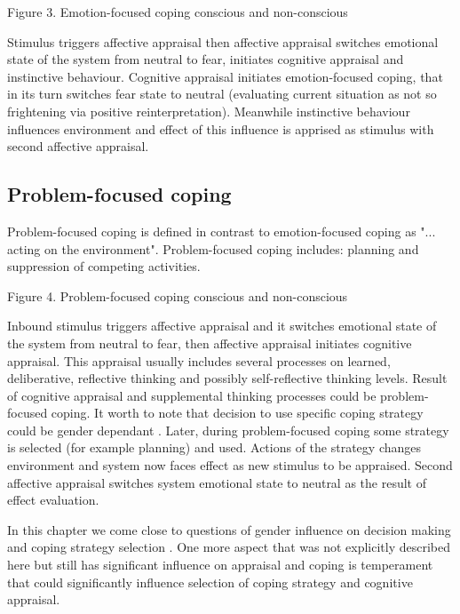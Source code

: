 \begin{center}
Figure 3. Emotion-focused coping conscious and non-conscious
\end{center}

Stimulus triggers affective appraisal then affective appraisal switches emotional state of the system from neutral to fear, initiates cognitive appraisal and instinctive behaviour. Cognitive appraisal initiates emotion-focused coping, that in its turn switches fear state to neutral (evaluating current situation as not so frightening via positive reinterpretation). Meanwhile instinctive behaviour influences environment and effect of this influence is apprised as stimulus with second affective appraisal.

\subsection{Problem-focused coping}

Problem-focused coping is defined in contrast to emotion-focused coping as "... acting on the environment". Problem-focused coping includes: planning and suppression of competing activities.

\begin{center}
Figure 4. Problem-focused coping conscious and non-conscious
\end{center}

Inbound stimulus triggers affective appraisal and it switches emotional state of the system from neutral to fear, then affective appraisal initiates cognitive appraisal. This appraisal usually includes several processes on learned, deliberative, reflective thinking and possibly self-reflective thinking levels. Result of cognitive appraisal and supplemental thinking processes could be problem-focused coping. It worth to note that decision to use specific coping strategy could be gender dependant \cite{sex_differencies}. Later, during problem-focused coping some strategy is selected (for example planning) and used. Actions of the strategy changes environment and system now faces effect as new stimulus to be appraised. Second affective appraisal switches system emotional state to neutral as the result of effect evaluation.

In this chapter we come close to questions of gender influence on decision making and coping strategy selection \cite{sex_differencies}. One more aspect that was not explicitly described here but still has significant influence on appraisal and coping is temperament that could significantly influence selection of coping strategy and cognitive appraisal.

